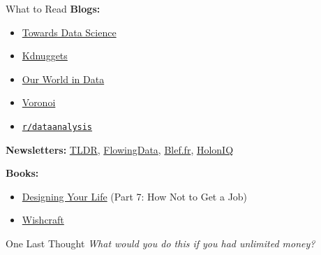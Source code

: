 \documentclass[10pt,a4paper]{article}
\begin{document}
\begin{multicols}{3}
\begin{textboxYellow}{What to Read}
\textbf{Blogs:}
\begin{itemize}
    \item \href{https://towardsdatascience.com/}{Towards Data Science}
    \item \href{https://www.kdnuggets.com/}{Kdnuggets}
    \item \href{https://ourworldindata.org/}{Our World in Data}
    \item \href{https://www.voronoiapp.com/}{Voronoi}
    \item \href{https://reddit.com/r/dataanalysis/}{\texttt{r/dataanalysis}}
\end{itemize}
\textbf{Newsletters:} \href{https://tldr.tech/newsletters}{TLDR}, \href{https://flowingdata.com/newsletter/}{FlowingData}, \href{https://www.blef.fr/}{Blef.fr}, \href{https://www.holoniq.com/newsletters}{HolonIQ}

\textbf{Books:}
\begin{itemize}
    \item \href{https://www.amazon.com/Designing-Your-Life-Well-Lived-Joyful/dp/1101923083}{Designing Your Life} (Part 7: How Not to Get a Job)
    \item \href{https://www.amazon.com/Wishcraft-How-What-Really-Want/dp/0345465180}{Wishcraft}
\end{itemize}
\end{textboxYellow}

\begin{textbox}{One Last Thought}
\emph{What would you do this if you had unlimited money?}
\end{textbox}


\date{\today}
\end{multicols}
\end{document}
